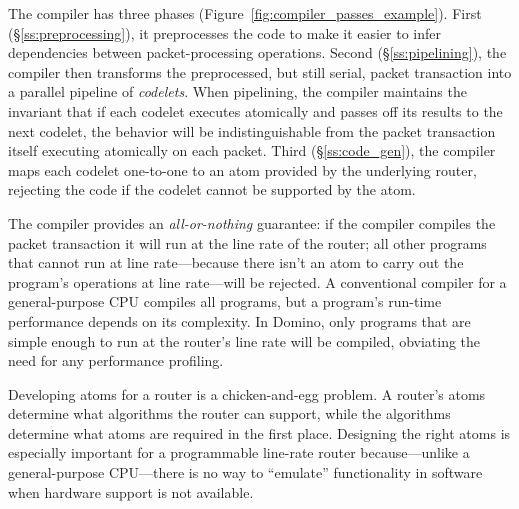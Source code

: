 The compiler has three phases (Figure~\ref{fig:compiler_passes_example}). First
(\S\ref{ss:preprocessing}), it preprocesses the code to make it easier to infer
dependencies between packet-processing operations. Second
(\S\ref{ss:pipelining}), the compiler then transforms the preprocessed, but
still serial, packet transaction into a parallel pipeline of {\em codelets}.
When pipelining, the compiler maintains the invariant that if each codelet
executes atomically and passes off its results to the next codelet, the
behavior will be indistinguishable from the packet transaction itself executing
atomically on each packet. Third (\S\ref{ss:code_gen}), the compiler maps each
codelet one-to-one to an atom provided by the underlying router, rejecting the
code if the codelet cannot be supported by the atom.

The compiler provides an {\em all-or-nothing} guarantee: if the compiler
compiles the packet transaction it will run at the line rate of the router; all
other programs that cannot run at line rate---because there isn't an atom to
carry out the program's operations at line rate---will be rejected. A
conventional compiler for a general-purpose CPU compiles all programs, but a
program's run-time performance depends on its complexity. In Domino, only
programs that are simple enough to run at the router's line rate will be
compiled, obviating the need for any performance profiling.

Developing atoms for a router is a chicken-and-egg problem. A router's atoms
determine what algorithms the router can support, while the algorithms
determine what atoms are required in the first place. Designing the right atoms
is especially important for a programmable line-rate router because---unlike a
general-purpose CPU---there is no way to ``emulate'' functionality in software
when hardware support is not available.

